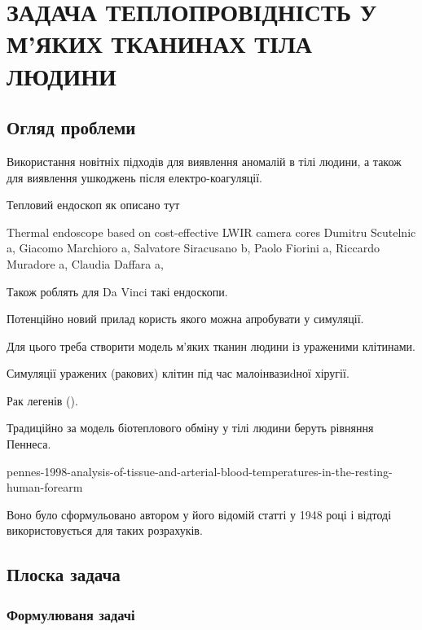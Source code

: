 \chapter{ЗАДАЧА ТЕПЛОПРОВІДНІСТЬ У М'ЯКИХ ТКАНИНАХ ТІЛА ЛЮДИНИ}

\nocite{bahvalov-et-al,tumor-thermal-modell,lung-tumor-thermal-conductivity,database-tissue-properties} 

\section{Огляд проблеми}

Використання новітніх підходів для виявлення аномалій в тілі людини, а також для виявлення ушкоджень після 
електро-коагуляції.

Тепловий ендоскоп як описано тут

Thermal endoscope based on cost-effective LWIR camera cores
Dumitru Scutelnic a, Giacomo Marchioro a, Salvatore Siracusano b, Paolo Fiorini a,
Riccardo Muradore a, Claudia Daffara a,

Також роблять для Da Vinci такі ендоскопи.

Потенційно новий прилад користь якого можна апробувати у симуляції.

Для цього треба створити модель м'яких тканин людини із ураженими клітинами. 

Симуляції уражених (ракових) клітин під час малоінвазиdної хіругії.

Рак легенів (\cite{lung-tumor-thermal-conductivity}).

Традиційно за модель біотеплового обміну у тілі людини беруть рівняння Пеннеса.

pennes-1998-analysis-of-tissue-and-arterial-blood-temperatures-in-the-resting-human-forearm

Воно було сформульовано автором у його відомій статті у 1948 році і відтоді використовується для таких розрахуків.


\section{Плоска задача}

\subsection{Формулюваня задачі}

